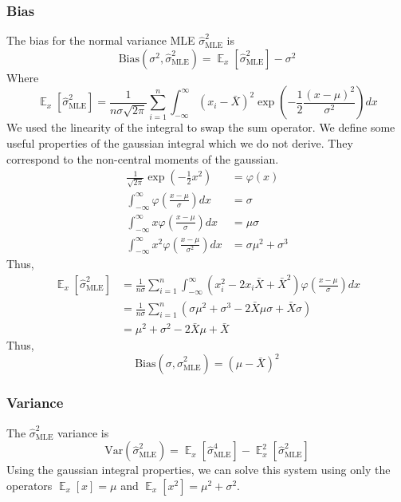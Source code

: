 \documentclass{article}
\DeclareMathOperator{\E}{\mathbb{E}}
\numberwithin{equation}{section}
\newcommand{\mle}[1]{\hat{#1}_{\text{MLE}}}
\begin{document}
\subsubsection{Bias}
The bias for the normal variance MLE $\mle{\sigma}^2$ is
 \[
         \text{Bias}(\sigma^2, \mle{\sigma}^2) = \E_x[\mle{\sigma}^2] - \sigma^2 
\]
Where
\[
        \E_x[\mle{\sigma}^2] = \frac{1}{n\sigma \sqrt{2\pi}}\sum_{i = 1}^n 
        \int_{-\infty}^\infty 
        (x_i - \bar{X})^2 \exp \left( -\frac{1}{2} \frac{(x - \mu)^2}{\sigma^2} \right) 
        dx
\]
We used the linearity of the integral to swap the sum operator. We define some 
useful properties of the gaussian integral which we do not derive. They 
correspond to the non-central moments of the gaussian.
\begin{align*}
        \frac{1}{\sqrt{2\pi}} \exp \left( - \frac{1}{2} x^2 \right) &= \varphi(x) \\
        \int_{-\infty}^\infty \varphi \left(  \frac{x - \mu}{\sigma } \right) dx &= \sigma  \\
        \int_{-\infty}^\infty  x \varphi \left( \frac{x - \mu}{\sigma} \right) dx &= \mu \sigma \\
        \int_{-\infty}^\infty x^2 \varphi \left( \frac{x - \mu}{\sigma^2} \right)dx &=
        \sigma\mu^2 + \sigma^3 
\end{align*} 
Thus,
\begin{align*}
        \E_x[\mle{\sigma}^2] &= \frac{1}{n\sigma }
        \sum_{i = 1}^n \int_{-\infty}^\infty (x_i^2 - 2x_i \bar{X} + \bar{X}^2)
                \varphi \left( \frac{x - \mu}{\sigma} \right) dx \\
                             &= \frac{1}{n\sigma} \sum_{i = 1}^n 
                             \left(\sigma \mu^2 + \sigma^3 - 2\bar{X}\mu\sigma + 
                             \bar{X}\sigma  \right)  \\
        &= \mu^2 + \sigma^2 - 2\bar{X}\mu + \bar{X}
\end{align*} 
Thus,
\[
        \boxed{\text{Bias}(\sigma, \mle{\sigma}^2) = (\mu - \bar{X})^2 }
\]


\subsubsection{Variance}
The $\mle{\sigma}^2$ variance is 
\[
        \text{Var}(\mle{\sigma}^2) = \E_x[\mle{\sigma}^4] - \E_x^2[\mle{\sigma}^2] 
\]
Using the gaussian integral properties, we can solve this system using only the operators 
$\E_x[x] = \mu$ and $\E_x[x^2] = \mu^2 + \sigma^2$.
\end{document}
